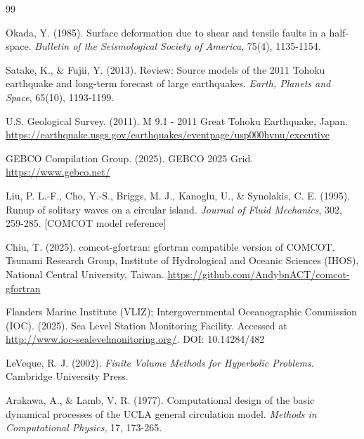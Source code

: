\documentclass[12pt]{article}
\begin{document}
\begin{thebibliography}{99}

Okada, Y. (1985). Surface deformation due to shear and tensile faults in a half-space. \textit{Bulletin of the Seismological Society of America}, 75(4), 1135-1154.

Satake, K., \& Fujii, Y. (2013). Review: Source models of the 2011 Tohoku earthquake and long-term forecast of large earthquakes. \textit{Earth, Planets and Space}, 65(10), 1193-1199.

U.S. Geological Survey. (2011). M 9.1 - 2011 Great Tohoku Earthquake, Japan. \url{https://earthquake.usgs.gov/earthquakes/eventpage/usp000hvnu/executive}

GEBCO Compilation Group. (2025). GEBCO 2025 Grid. \url{https://www.gebco.net/}

Liu, P. L.-F., Cho, Y.-S., Briggs, M. J., Kanoglu, U., \& Synolakis, C. E. (1995). Runup of solitary waves on a circular island. \textit{Journal of Fluid Mechanics}, 302, 259-285. [COMCOT model reference]

Chiu, T. (2025). comcot-gfortran: gfortran compatible version of COMCOT. Tsunami Research Group, Institute of Hydrological and Oceanic Sciences (IHOS), National Central University, Taiwan. \url{https://github.com/AndybnACT/comcot-gfortran}

Flanders Marine Institute (VLIZ); Intergovernmental Oceanographic Commission (IOC). (2025). Sea Level Station Monitoring Facility. Accessed at \url{http://www.ioc-sealevelmonitoring.org/}. DOI: 10.14284/482

LeVeque, R. J. (2002). \textit{Finite Volume Methods for Hyperbolic Problems}. Cambridge University Press.

Arakawa, A., \& Lamb, V. R. (1977). Computational design of the basic dynamical processes of the UCLA general circulation model. \textit{Methods in Computational Physics}, 17, 173-265.

\end{thebibliography}
\end{document}
